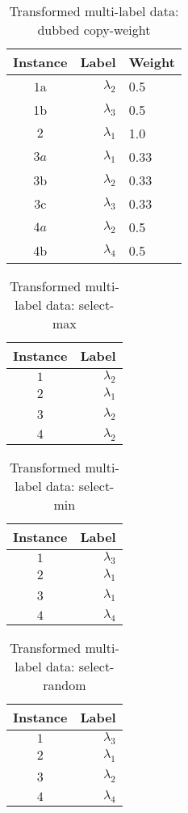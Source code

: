 \begin{table}[!htb]
\centering
\caption{Transformed multi-label data: dubbed copy-weight}
\label{table:MLb}
\begin{tabular}{c|r|l}
\toprule
Instance & Label & Weight\\
\hline
$1$a & $\lambda_2$ & 0.5 \\
1b & $\lambda_3$ & 0.5 \\
$2$ & $\lambda_1$ & 1.0 \\
$3a$ & $ \lambda_1$& 0.33 \\
3b & $\lambda_2$ & 0.33 \\
3c & $\lambda_3$& 0.33 \\
$4a$ & $\lambda_2$& 0.5 \\
4b & $\lambda_4$& 0.5 \\
\bottomrule
\end{tabular}
\end{table}

\begin{table}[!htb]
\centering
\caption{Transformed multi-label data: select-max}
\label{table:MLc}
\begin{tabular}{c|r}
\toprule
Instance & Label \\
\hline
$1$ & $\lambda_2$  \\
$2$ & $\lambda_1$ \\
3 & $\lambda_2$ \\
$4$ & $\lambda_2$ \\
\bottomrule
\end{tabular}
\end{table}

\begin{table}[!htb]
\centering
\caption{Transformed multi-label data: select-min}
\label{table:MLd}
\begin{tabular}{c|r}
\toprule
Instance & Label \\
\hline
$1$ & $\lambda_3$  \\
$2$ & $\lambda_1$ \\
3 & $\lambda_1$ \\
$4$ & $\lambda_4$ \\
\bottomrule
\end{tabular}
\end{table}

\begin{table}[!htb]
\centering
\caption{Transformed multi-label data: select-random}
\label{table:MLe}
\begin{tabular}{c|r}
\toprule
Instance & Label \\
\hline
$1$ & $\lambda_3$  \\
$2$ & $\lambda_1$ \\
3 & $\lambda_2$ \\
$4$ & $\lambda_4$ \\
\bottomrule
\end{tabular}
\end{table}

